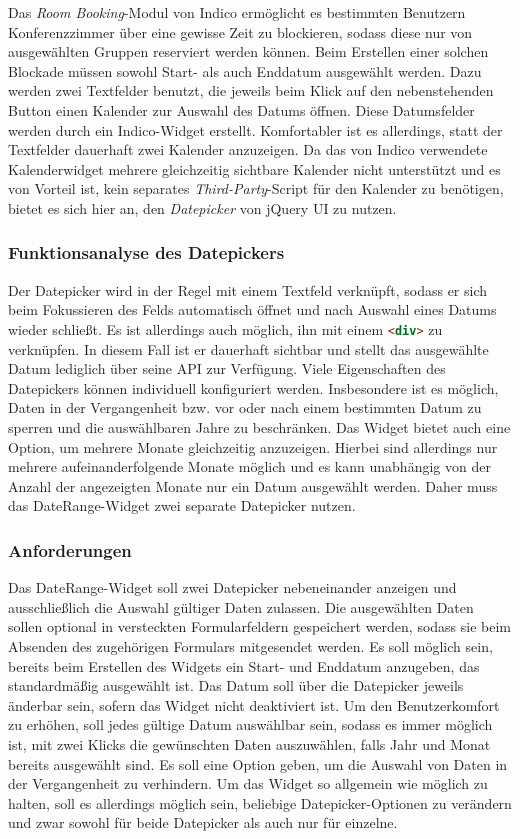 Das \emph{Room Booking}-Modul von Indico ermöglicht es bestimmten Benutzern Konferenzzimmer über
eine gewisse Zeit zu blockieren, sodass diese nur von ausgewählten Gruppen reserviert werden können.
Beim Erstellen einer solchen Blockade müssen sowohl Start- als auch Enddatum ausgewählt werden.
Dazu werden zwei Textfelder benutzt, die jeweils beim Klick auf den nebenstehenden Button einen
Kalender zur Auswahl des Datums öffnen. Diese Datumsfelder werden durch ein Indico-Widget erstellt.
Komfortabler ist es allerdings, statt der Textfelder dauerhaft zwei Kalender anzuzeigen. Da das von
Indico verwendete Kalenderwidget mehrere gleichzeitig sichtbare Kalender nicht unterstützt und es
von Vorteil ist, kein separates \emph{Third-Party}-Script für den Kalender zu benötigen, bietet es
sich hier an, den \emph{Datepicker} von jQuery UI zu nutzen.

\subsubsection{Funktionsanalyse des Datepickers}

Der Datepicker wird in der Regel mit einem Textfeld verknüpft, sodass er sich beim Fokussieren des
Felds automatisch öffnet und nach Auswahl eines Datums wieder schließt. Es ist allerdings auch
möglich, ihn mit einem \lstinline[language=HTML]{<div>} zu verknüpfen. In diesem Fall ist er
dauerhaft sichtbar und stellt das ausgewählte Datum lediglich über seine API zur Verfügung. Viele
Eigenschaften des Datepickers können individuell konfiguriert werden. Insbesondere ist es möglich,
Daten in der Vergangenheit bzw. vor oder nach einem bestimmten Datum zu sperren und die
auswählbaren Jahre zu beschränken. Das Widget bietet auch eine Option, um mehrere Monate
gleichzeitig anzuzeigen. Hierbei sind allerdings nur mehrere aufeinanderfolgende Monate möglich und
es kann unabhängig von der Anzahl der angezeigten Monate nur ein Datum ausgewählt werden. Daher muss
das DateRange-Widget zwei separate Datepicker nutzen.

\subsubsection{Anforderungen}

Das DateRange-Widget soll zwei Datepicker nebeneinander anzeigen und ausschließlich die Auswahl
gültiger Daten zulassen. Die ausgewählten Daten sollen optional in versteckten Formularfeldern
gespeichert werden, sodass sie beim Absenden des zugehörigen Formulars mitgesendet werden. Es soll
möglich sein, bereits beim Erstellen des Widgets ein Start- und Enddatum anzugeben, das
standardmäßig ausgewählt ist. Das Datum soll über die Datepicker jeweils änderbar sein, sofern das
Widget nicht deaktiviert ist. Um den Benutzerkomfort zu erhöhen, soll jedes gültige Datum auswählbar
sein, sodass es immer möglich ist, mit zwei Klicks die gewünschten Daten auszuwählen, falls Jahr und
Monat bereits ausgewählt sind. Es soll eine Option geben, um die Auswahl von Daten in der
Vergangenheit zu verhindern. Um das Widget so allgemein wie möglich zu halten, soll es allerdings
möglich sein, beliebige Datepicker-Optionen zu verändern und zwar sowohl für beide Datepicker als
auch nur für einzelne.


